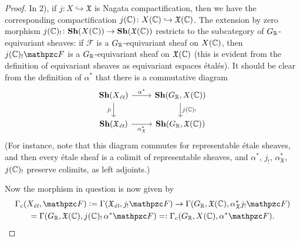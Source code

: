 \begin{proposition}
\begin{proof}
    In 2), if $j\colon X \hookrightarrow \mathfrak{X}$ is Nagata
    compactification, then we have the corresponding compactification
    $j (\mathbb{C})\colon X (\mathbb{C}) \hookrightarrow \mathfrak{X} (\mathbb{C})$. The extension by
    zero morphism
    $j (\mathbb{C})_!\colon \text{\bf Sh} (X (\mathbb{C})) \to \text{\bf Sh} (\mathfrak{X} (\mathbb{C}))$
    restricts to the subcategory of $G_{\mathbb{R}}$-equivariant sheaves: if
    $\mathcal{F}$ is a $G_{\mathbb{R}}$-equivariant sheaf on $X (\mathbb{C})$, then
    $j (\CC)_! \mathcal{F}$ is a $G_{\mathbb{R}}$-equivariant sheaf on
    $\mathfrak{X} (\mathbb{C})$ (this is evident from the definition of equivariant
    sheaves as equivariant espaces étalés). It should be clear from the
    definition of $\alpha^*$ that there is a commutative diagram
    \[ \begin{tikzcd}
        \categ{Sh} (X_\text{\it ét}) \ar{r}{\alpha^*}\ar{d}[swap]{j_!} & \categ{Sh} (G_\RR, X (\CC)) \ar{d}{j (\CC)_!} \\
        \categ{Sh} (\mathfrak{X}_\text{\it ét}) \ar{r}[swap]{\alpha^*_\mathfrak{X}} & \categ{Sh} (G_\RR, \mathfrak{X} (\CC))
      \end{tikzcd} \]
    (For instance, note that this diagram commutes for representable étale
    sheaves, and then every étale sheaf is a colimit of representable sheaves,
    and $\alpha^*$, $j_!$, $\alpha^*_\mathfrak{X}$, $j (\mathbb{C})_!$ preserve
    colimits, as left adjoints.)

    Now the morphism in question is now given by
    \begin{multline*}
      \Gamma_c (X_\text{\it ét}, \mathcal{F}) \dfn
      \Gamma (\mathfrak{X}_\text{\it ét}, j_! \mathcal{F}) \to
      \Gamma (G_\RR, \mathfrak{X} (\CC), \alpha^*_\mathfrak{X} j_! \mathcal{F}) \\
      = \Gamma (G_\RR, \mathfrak{X} (\CC), j (\CC)_! \, \alpha^* \mathcal{F})
      \rdfn \Gamma_c (G_\RR, X (\CC), \alpha^* \mathcal{F}).
    \end{multline*}
  \end{proof}
\end{proposition}

